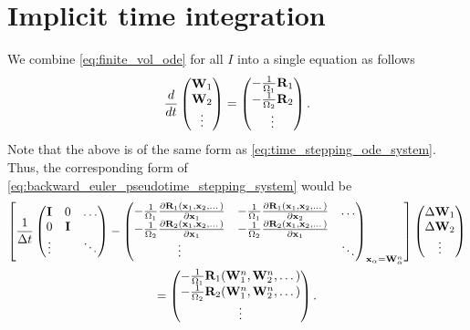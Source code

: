 \documentclass[oneside,a4paper,11pt]{report}
\begin{document}
\section{Implicit time integration}
We combine \cref{eq:finite_vol_ode} for all $I$ into a single equation as follows
\begin{equation}
    \frac{d}{dt} \begin{pmatrix} \mathbf{W}_1 \\ \mathbf{W}_2 \\ \vdots \end{pmatrix} = \begin{pmatrix} -\frac{1}{\Omega_1} \mathbf{R}_1 \\ -\frac{1}{\Omega_2} \mathbf{R}_2 \\ \vdots \end{pmatrix}.
\end{equation}
Note that the above is of the same form as \cref{eq:time_stepping_ode_system}. Thus, the corresponding form of \cref{eq:backward_euler_pseudotime_stepping_system} would be
\begin{multline}
    \left [ 
    \frac{1}{\Delta t} \begin{pmatrix} \mathbf{I} & 0 & \dots \\ 0 & \mathbf{I} & \\ \vdots &  & \ddots \end{pmatrix} - 
    \begin{pmatrix} -\frac{1}{\Omega_1} \frac{\partial \mathbf{R}_1(\mathbf{x}_1, \mathbf{x}_2, \dots)}{\partial \mathbf{x}_1} & -\frac{1}{\Omega_1} \frac{\partial \mathbf{R}_1(\mathbf{x}_1, \mathbf{x}_2, \dots)}{\partial \mathbf{x}_2} & \dots \\ -\frac{1}{\Omega_2} \frac{\partial \mathbf{R}_2(\mathbf{x}_1, \mathbf{x}_2, \dots)}{\partial \mathbf{x}_1} & -\frac{1}{\Omega_2} \frac{\partial \mathbf{R}_2(\mathbf{x}_1, \mathbf{x}_2, \dots)}{\partial \mathbf{x}_1} & \\ \vdots & & \ddots \end{pmatrix}_{\mathbf{x}_\alpha = \mathbf{W}_\alpha^n} \right ]
    \begin{pmatrix} \Delta \mathbf{W}_1 \\ \Delta \mathbf{W}_2 \\ \vdots \end{pmatrix} \\
    = \begin{pmatrix} -\frac{1}{\Omega_1} \mathbf{R}_1(\mathbf{W}_1^n, \mathbf{W}_2^n,\dots) \\ -\frac{1}{\Omega_2} \mathbf{R}_2(\mathbf{W}_1^n, \mathbf{W}_2^n,\dots) \\ \vdots \end{pmatrix}.
\end{multline}
\end{document}
